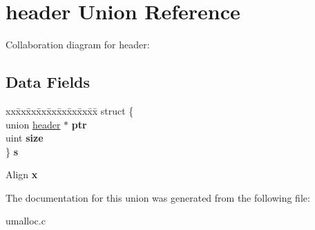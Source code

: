 \hypertarget{unionheader}{}\section{header Union Reference}
\label{unionheader}


Collaboration diagram for header\+:
\subsection*{Data Fields}
\begin{DoxyCompactItemize}
\item 
\begin{tabbing}
xx\=xx\=xx\=xx\=xx\=xx\=xx\=xx\=xx\=\kill
struct \{\\
\>union \hyperlink{unionheader}{header} $\ast$ {\bfseries ptr}\\
\>uint {\bfseries size}\\
\} {\bfseries s}\hypertarget{unionheader_a285eb3e439ca5d5334d7177dcd866c22}{}\label{unionheader_a285eb3e439ca5d5334d7177dcd866c22}
\\

\end{tabbing}\item 
Align {\bfseries x}\hypertarget{unionheader_a2f321dbb657408f93d0c585f55951bdb}{}\label{unionheader_a2f321dbb657408f93d0c585f55951bdb}

\end{DoxyCompactItemize}


The documentation for this union was generated from the following file\+:\begin{DoxyCompactItemize}
\item 
umalloc.\+c\end{DoxyCompactItemize}
